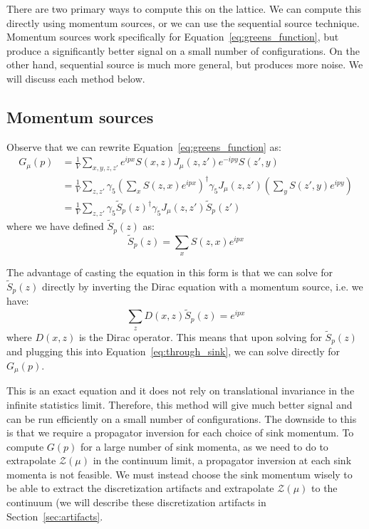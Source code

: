 \documentclass[11pt, oneside]{article}   	%
\theoremstyle{definition}
\begin{document}
There are two primary ways to compute this on the lattice.
We can compute this directly using momentum sources, or 
we can use the sequential source technique. Momentum sources work specifically for Equation~\ref{eq:greens_function}, 
but produce a significantly better signal on a small number of configurations. On the other hand, sequential source 
is much more general, but produces more noise. We will discuss each method below.

\subsection{Momentum sources}

Observe that we can rewrite Equation~\ref{eq:greens_function} as:
\begin{align}
	G_\mu(p) &= \frac{1}{V}\sum_{x, y, z, z'} e^{ipx} S(x, z) J_\mu(z, z') e^{-ipy} S(z', y) \nonumber\\
	&= \frac{1}{V}\sum_{z, z'}\gamma_5\left(\sum_x S(z, x) e^{ipx}\right)^\dagger\gamma_5 J_\mu(z, z') \left(\sum_y S(z', y) 
	e^{ipy} \right) \nonumber\\
	&= \frac{1}{V}\sum_{z, z'} \gamma_5 \tilde S_p(z)^\dagger \gamma_5 J_\mu(z, z') \tilde S_p(z')~
	\label{eq:through_sink}
\end{align}
where we have defined $\tilde S_p(z)$ as:
\begin{equation}
	\tilde S_p(z) = \sum_x S(z, x) e^{ipx}
\end{equation}

The advantage of casting the equation in this form is that we can solve for $\tilde S_p(z)$ directly by inverting the Dirac 
equation with a momentum source, i.e. we have:
\begin{equation}
	\sum_{z} D(x, z) \tilde S_p(z) = e^{ipx}
\end{equation}
where $D(x, z)$ is the Dirac operator. This means that upon solving for $\tilde S_p(z)$ and plugging this into 
Equation~\ref{eq:through_sink}, we can solve directly for $G_\mu(p)$. 

This is an exact equation and it does not rely on translational invariance in the infinite statistics limit. 
Therefore, this method will give much better signal and can be run efficiently on a small number of configurations. The 
downside to this is that we require a propagator inversion for each choice of sink momentum. 
To compute $G(p)$ for a large number of sink momenta, as we need to do to extrapolate $\mathcal Z(\mu)$ in the 
continuum limit, a propagator inversion at each sink momenta is not feasible. We must instead choose the sink momentum 
wisely to be able to extract the discretization artifacts and extrapolate $\mathcal Z(\mu)$ to the continuum (we will describe 
these discretization artifacts in Section~\ref{sec:artifacts}. 
\end{document}
